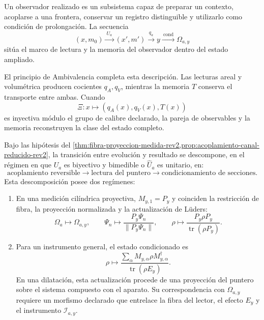 Un observador realizado es un subsistema capaz de preparar un contexto,
acoplarse a una frontera, conservar un registro distinguible y utilizarlo
como condición de prolongación. La secuencia
\begin{equation}
 (x,m_0)
 \xrightarrow{\ U_a\ }(x',m')
 \xrightarrow{\ q_a\ }y
 \xrightarrow{\ \mathrm{cond}\ }\Omega_{a,y}
 \label{eq:secuencia-observador-rev2}
\end{equation}
sitúa el marco de lectura y la memoria del observador dentro del estado
ampliado.

El principio de Ambivalencia completa esta descripción. Las lecturas areal y
volumétrica producen cocientes \(q_A,q_V\), mientras la memoria \(T\)
conserva el transporte entre ambas. Cuando
\[
 \Xi:x\longmapsto(q_A(x),q_V(x),T(x))
\]
es inyectiva módulo el grupo de calibre declarado, la pareja de observables y
la memoria reconstruyen la clase del estado completo.

\begin{theorem}
\label{thm:descomposicion-medicion-rev2}
Bajo las hipótesis del
\cref{thm:fibra-proyeccion-medida-rev2,prop:acoplamiento-canal-reducido-rev2}, la
transición entre evolución y resultado se descompone, en el régimen en que
\(U_a\) es biyectivo y bimedible o \(\widehat U_a\) es unitario, en:
\[
 \text{acoplamiento reversible}
 \longrightarrow
 \text{lectura del puntero}
 \longrightarrow
 \text{condicionamiento de secciones}.
\]
Esta descomposición posee dos regímenes:
\begin{enumerate}
\item En una medición cilíndrica proyectiva, \(M_{y,1}=P_y\) y coinciden la
restricción de fibra, la proyección normalizada y la actualización de Lüders:
\[
 \Omega_a\longmapsto\Omega_{a,y},
 \qquad
 \Psi_n\longmapsto\frac{P_y\Psi_n}{\|P_y\Psi_n\|},
 \qquad
 \rho\longmapsto
 \frac{P_y\rho P_y}{\operatorname{tr}(\rho P_y)}.
\]
\item Para un instrumento general, el estado condicionado es
\[
 \rho\longmapsto
 \frac{\sum_\alpha M_{y,\alpha}\rho M_{y,\alpha}^\dagger}
 {\operatorname{tr}(\rho E_y)}.
\]
En una dilatación, esta actualización procede de una proyección del puntero
sobre el sistema compuesto con el aparato. Su correspondencia con
\(\Omega_{a,y}\) requiere un morfismo declarado que entrelace la fibra del
lector, el efecto \(E_y\) y el instrumento \(\mathcal I_{a,y}\).
\end{enumerate}
\end{theorem}


